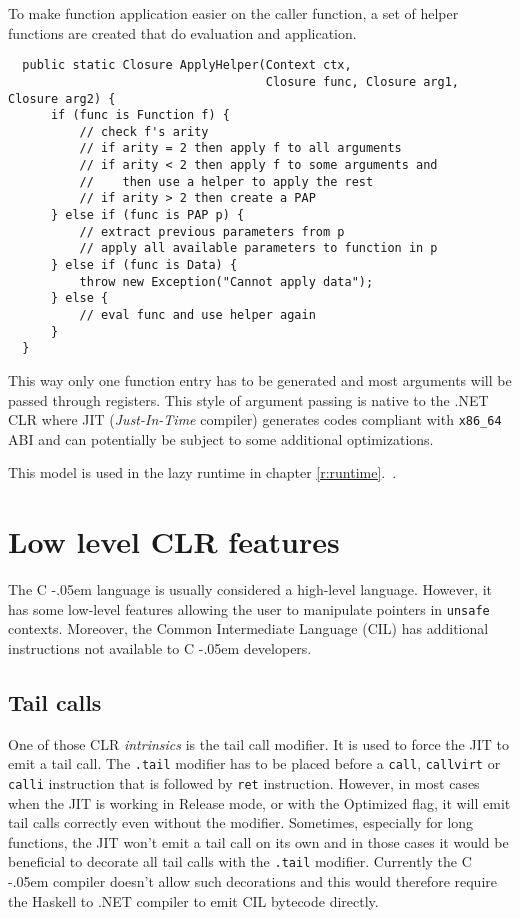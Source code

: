 \documentclass[en]{pracamgr}
\newcommand{\shrp}{%
  {\settoheight{\dimen0}{C}\kern-.05em \resizebox{!}{\dimen0}{\raisebox{\depth}{\textbf{\#}}}\hspace{1ex}}}
\newcommand{\myref}[1]{\ref{#1}.~\nameref{#1}}
\begin{document}
To make function application easier on the caller function, a set of helper functions
are created that do evaluation and application.

\begin{verbatim}
  public static Closure ApplyHelper(Context ctx, 
                                    Closure func, Closure arg1, Closure arg2) {
      if (func is Function f) {
          // check f's arity
          // if arity = 2 then apply f to all arguments
          // if arity < 2 then apply f to some arguments and
          //    then use a helper to apply the rest
          // if arity > 2 then create a PAP
      } else if (func is PAP p) {
          // extract previous parameters from p
          // apply all available parameters to function in p
      } else if (func is Data) {
          throw new Exception("Cannot apply data");
      } else {
          // eval func and use helper again
      }
  }
\end{verbatim}

This way only one function entry has to be generated and most arguments
will be passed through registers. This style of argument passing is
native to the .NET CLR where JIT (\textit{Just-In-Time} compiler) generates
codes compliant with \texttt{x86\_64} ABI and can potentially be subject to
some additional optimizations.

This model is used in the lazy runtime in chapter \myref{r:runtime}.

\chapter{Low level CLR features}\label{r:lowlevel}

The C\shrp language is usually considered a high-level language.
However, it has some low-level features allowing the user to
manipulate pointers in \texttt{unsafe} contexts.
Moreover, the Common Intermediate Language (CIL) has additional
instructions not available to C\shrp developers.

\section{Tail calls}

One of those CLR \textit{intrinsics} is the tail call modifier.
It is used to force the JIT to emit a tail call.
The \texttt{.tail} modifier has to be placed before a \texttt{call},
\texttt{callvirt} or \texttt{calli} instruction that is followed by
\texttt{ret} instruction. However, in most cases when the JIT is
working in Release mode, or with the Optimized flag, it will
emit tail calls correctly even without the modifier. Sometimes,
especially for long functions, the JIT won't emit a tail call
on its own and in those cases it would be beneficial to decorate
all tail calls with the \texttt{.tail} modifier. Currently the
C\shrp compiler doesn't allow such decorations and this would
therefore require the Haskell to .NET compiler to emit CIL bytecode
directly.
\end{document}
